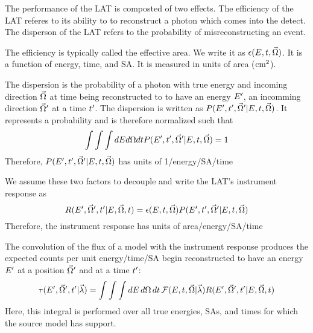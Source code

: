 

The performance of the LAT is composted of two effects.
The efficiency of the LAT referes to its ability to to
reconstruct a photon which comes into the detect.
The disperson of the LAT refers to the probability of
misreconstructing an event. 


The efficiency is typically called the effective area.
We write it as $\epsilon(E,t,\vec\Omega)$.
It is a function of energy, time, and \ac{SA}.
It is measured in units of area ($\text{cm}^2$).



The dispersion is the probability of a photon with true energy \energy
and incoming direction $\vec\Omega$ at time \time being reconstructed to 
to have an energy $E'$, an incomming direction $\vec\Omega'$ at a time $t'$.
The dispersion is written as $P(E',t',\vec\Omega'|E,t,\vec\Omega)$.
It represents a probability and is therefore normalized such that
\begin{equation}
  \int \int \int dE d\Omega dt P(E',t',\vec\Omega'|E,t,\vec\Omega) = 1
\end{equation}
Therefore, $P(E',t',\vec\Omega'|E,t,\vec\Omega)$ 
has units of 1/energy/\ac{SA}/time



We assume these two factors to decouple and write the LAT's instrument response as
\begin{equation}
  R(E',\vec\Omega',t'|E,\vec\Omega,t) = 
\epsilon(E,t,\vec\Omega) P(E',t',\vec\Omega'|E,t,\vec\Omega)
\end{equation}
Therefore, the instrument response has units of area/energy/\ac{SA}/time

The convolution of the flux of a model with the instrument response 
produces the expected counts per unit energy/time/\ac{SA}
begin reconstructed to have 
an energy $E'$ 
at a position $\vec\Omega'$ and at a time $t'$:
\begin{equation}
  \eqnlabel{eventrate}
  \eventrate(\energy',\solidangle',\time'|\modelparams)
  = \int \int \int \denergy \, \dsolidangle \, \dtime \,
  \fluxdensity(\energy,\time,\vec\Omega|\modelparams) \response(\energy',\solidangle',\time'|\energy,\solidangle,\time)
\end{equation}
Here, this integral is performed over all true energies, \acp{SA}, and times
for which the source model has support.

